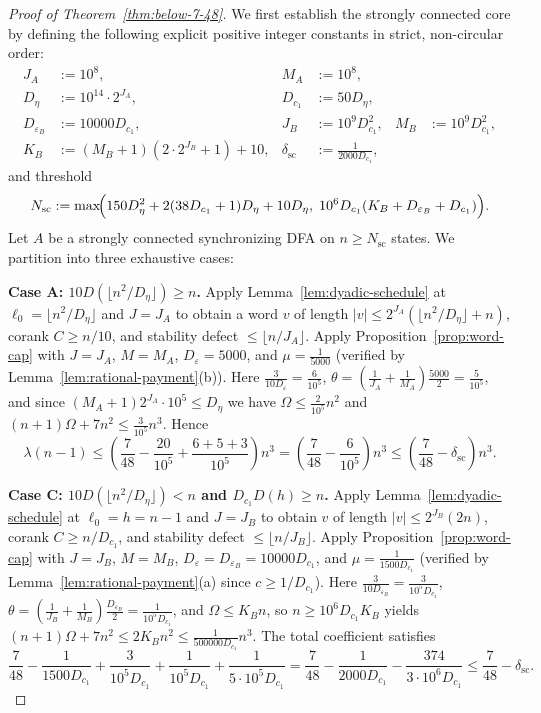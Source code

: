 \documentclass[11pt]{article}
\theoremstyle{definition}
\theoremstyle{remark}
\begin{document}
\begin{proof}[Proof of Theorem~\ref{thm:below-7-48}]
We first establish the strongly connected core by defining the following explicit positive integer constants in strict, non-circular order:
\begin{align*}
  J_A &:= 10^8, & M_A &:= 10^8, \\
  D_\eta &:= 10^{14} \cdot 2^{J_A}, & D_{c_1} &:= 50 D_\eta, \\
  D_{\varepsilon_B} &:= 10000 D_{c_1}, & J_B &:= 10^9 D_{c_1}^2, & M_B &:= 10^9 D_{c_1}^2, \\
  K_B &:= (M_B + 1)(2 \cdot 2^{J_B} + 1) + 10, & \delta_{\mathrm{sc}} &:= \frac{1}{2000 D_{c_1}},
\end{align*}
and threshold
\[
  N_{\mathrm{sc}} := \max\!\Bigl(150 D_\eta^2 + 2(38 D_{c_1} + 1) D_\eta + 10 D_\eta,\;
    10^6 D_{c_1}(K_B + D_{\varepsilon_B} + D_{c_1})\Bigr).
\]
Let $A$ be a strongly connected synchronizing DFA on $n \ge N_{\mathrm{sc}}$ states. We partition into three exhaustive cases:

\smallskip
\noindent\textbf{Case A: $10 D(\lfloor n^2 / D_\eta \rfloor) \ge n$.}
Apply Lemma~\ref{lem:dyadic-schedule} at $\ell_0 = \lfloor n^2 / D_\eta \rfloor$ and $J = J_A$ to obtain a word $v$ of length $|v| \le 2^{J_A}(\lfloor n^2/D_\eta \rfloor + n)$, corank $C \ge n / 10$, and stability defect $\le \lfloor n / J_A \rfloor$. Apply Proposition~\ref{prop:word-cap} with $J = J_A$, $M = M_A$, $D_\varepsilon = 5000$, and $\mu = \frac{1}{5000}$ (verified by Lemma~\ref{lem:rational-payment}(b)). Here $\frac{3}{10 D_\varepsilon} = \frac{6}{10^5}$, $\theta = (\frac{1}{J_A} + \frac{1}{M_A}) \frac{5000}{2} = \frac{5}{10^5}$, and since $(M_A + 1) 2^{J_A} \cdot 10^5 \le D_\eta$ we have $\Omega \le \frac{2}{10^5} n^2$ and $(n + 1)\Omega + 7 n^2 \le \frac{3}{10^5} n^3$. Hence
\[
  \lambda(n - 1) \le \left(\frac{7}{48} - \frac{20}{10^5} + \frac{6 + 5 + 3}{10^5}\right) n^3
  = \left(\frac{7}{48} - \frac{6}{10^5}\right) n^3 \le \left(\frac{7}{48} - \delta_{\mathrm{sc}}\right) n^3.
\]

\smallskip
\noindent\textbf{Case C: $10 D(\lfloor n^2 / D_\eta \rfloor) < n$ and $D_{c_1} D(h) \ge n$.}
Apply Lemma~\ref{lem:dyadic-schedule} at $\ell_0 = h = n - 1$ and $J = J_B$ to obtain $v$ of length $|v| \le 2^{J_B}(2n)$, corank $C \ge n / D_{c_1}$, and stability defect $\le \lfloor n / J_B \rfloor$. Apply Proposition~\ref{prop:word-cap} with $J = J_B$, $M = M_B$, $D_\varepsilon = D_{\varepsilon_B} = 10000 D_{c_1}$, and $\mu = \frac{1}{1500 D_{c_1}}$ (verified by Lemma~\ref{lem:rational-payment}(a) since $c \ge 1/D_{c_1}$). Here $\frac{3}{10 D_{\varepsilon_B}} = \frac{3}{10^5 D_{c_1}}$, $\theta = (\frac{1}{J_B} + \frac{1}{M_B}) \frac{D_{\varepsilon_B}}{2} = \frac{1}{10^5 D_{c_1}}$, and $\Omega \le K_B n$, so $n \ge 10^6 D_{c_1} K_B$ yields $(n + 1)\Omega + 7 n^2 \le 2 K_B n^2 \le \frac{1}{500000 D_{c_1}} n^3$. The total coefficient satisfies
\[
  \frac{7}{48} - \frac{1}{1500 D_{c_1}} + \frac{3}{10^5 D_{c_1}} + \frac{1}{10^5 D_{c_1}} + \frac{1}{5\cdot 10^5 D_{c_1}}
  = \frac{7}{48} - \frac{1}{2000 D_{c_1}} - \frac{374}{3\cdot 10^6 D_{c_1}}
  \le \frac{7}{48} - \delta_{\mathrm{sc}}.
\]


\end{proof}
\end{document}
